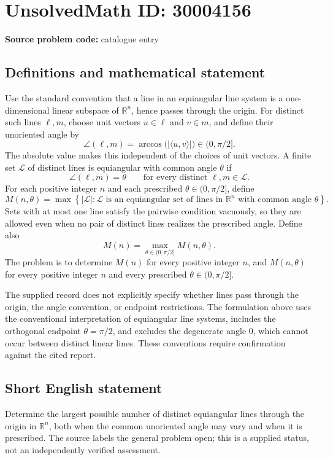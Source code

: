 \documentclass[11pt]{article}
\newcommand{\R}{\mathbb{R}}
\begin{document}
\section*{UnsolvedMath ID: 30004156}
\textbf{Source problem code:} catalogue entry
\subsection{Definitions and mathematical statement}
Use the standard convention that a line in an equiangular line system is a one-dimensional linear subspace of \(\R^n\), hence passes through the origin. For distinct such lines \(\ell,m\), choose unit vectors \(u\in\ell\) and \(v\in m\), and define their unoriented angle by
\[
\angle(\ell,m)=\arccos\bigl(|\langle u,v\rangle|\bigr)\in(0,\pi/2].
\]
The absolute value makes this independent of the choices of unit vectors. A finite set \(\mathcal L\) of distinct lines is equiangular with common angle \(\theta\) if
\[
\angle(\ell,m)=\theta
\qquad\text{for every distinct }\ell,m\in\mathcal L.
\]
For each positive integer \(n\) and each prescribed \(\theta\in(0,\pi/2]\), define
\[
M(n,\theta)=\max\left\{|\mathcal L|:\mathcal L\text{ is an equiangular set of lines in }\R^n\text{ with common angle }\theta\right\}.
\]
Sets with at most one line satisfy the pairwise condition vacuously, so they are allowed even when no pair of distinct lines realizes the prescribed angle. Define also
\[
M(n)=\max_{\theta\in(0,\pi/2]}M(n,\theta).
\]
The problem is to determine \(M(n)\) for every positive integer \(n\), and \(M(n,\theta)\) for every positive integer \(n\) and every prescribed \(\theta\in(0,\pi/2]\).

The supplied record does not explicitly specify whether lines pass through the origin, the angle convention, or endpoint restrictions. The formulation above uses the conventional interpretation of equiangular line systems, includes the orthogonal endpoint \(\theta=\pi/2\), and excludes the degenerate angle \(0\), which cannot occur between distinct linear lines. These conventions require confirmation against the cited report.
\subsection{Short English statement}
Determine the largest possible number of distinct equiangular lines through the origin in \(\R^n\), both when the common unoriented angle may vary and when it is prescribed. The source labels the general problem open; this is a supplied status, not an independently verified assessment.
\end{document}
